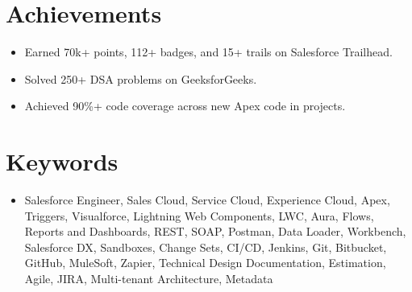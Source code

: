 \documentclass[letterpaper,10pt]{article}
\begin{document}
\section{Achievements}
\begin{itemize}[leftmargin=0.15in,label={},topsep=0pt,noitemsep]
    \item Earned 70k+ points, 112+ badges, and 15+ trails on Salesforce Trailhead.
    \item Solved 250+ DSA problems on GeeksforGeeks.
    \item Achieved 90\%+ code coverage across new Apex code in projects.
\end{itemize}

\section{Keywords}
\begin{itemize}[leftmargin=0.15in,label={},topsep=0pt,noitemsep]
    \item Salesforce Engineer, Sales Cloud, Service Cloud, Experience Cloud, Apex, Triggers, Visualforce, Lightning Web Components, LWC, Aura, Flows, Reports and Dashboards, REST, SOAP, Postman, Data Loader, Workbench, Salesforce DX, Sandboxes, Change Sets, CI/CD, Jenkins, Git, Bitbucket, GitHub, MuleSoft, Zapier, Technical Design Documentation, Estimation, Agile, JIRA, Multi-tenant Architecture, Metadata
\end{itemize}
\end{document}
